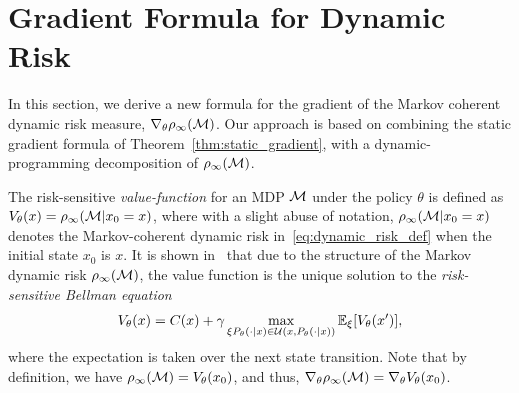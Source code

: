 \documentclass{article} %
\newcommand{\citep}{\cite}
\begin{document}

\section{Gradient Formula for Dynamic Risk}
\label{sec:dynamic}

In this section, we derive a new formula for the gradient of the Markov coherent dynamic risk measure, $\nabla_{\theta} \rho_\infty(\mathcal{M})$. Our approach is based on combining the static gradient formula of Theorem~\ref{thm:static_gradient}, with a dynamic-programming decomposition of $\rho_\infty(\mathcal{M})$.

The risk-sensitive \emph{value-function} for an MDP $\mathcal{M}$ under the policy $\theta$ is defined as $V_\theta(x)=\rho_\infty(\mathcal{M} | x_0 = x)$, where with a slight abuse of notation, $\rho_\infty(\mathcal{M} | x_0 = x)$ denotes the Markov-coherent dynamic risk in~\eqref{eq:dynamic_risk_def} when the initial state $x_0$ is $x$. It is shown in~\citep{ruszczynski2010risk} that due to the structure of the Markov dynamic risk $\rho_\infty(\mathcal{M})$, the value function is the unique solution to the \emph{risk-sensitive Bellman equation}
%
\begin{equation}\label{eq:T}
V_\theta(x) = C(x) + \gamma\max_{\xi P_\theta(\cdot |x)\in {\mathcal{U}}(x,P_\theta(\cdot |x))}\mathbb E_{\xi}[V_\theta(x')],
\end{equation}
%
where the expectation is taken over the next state transition. Note that by definition, we have $\rho_\infty(\mathcal{M}) = V_\theta(x_0)$, and thus, $\nabla_{\theta} \rho_\infty(\mathcal{M}) = \nabla_{\theta} V_\theta(x_0)$.
\end{document}
